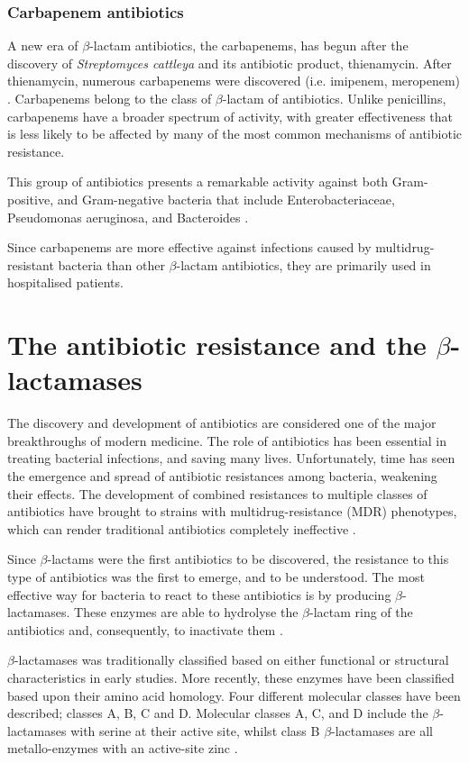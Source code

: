 \documentclass[11pt]{report}
\begin{document}
\subsection{Carbapenem antibiotics}
A new era of $\beta$-lactam antibiotics, the carbapenems, has begun after the discovery of \emph{Streptomyces cattleya} and its antibiotic product, thienamycin.
After thienamycin, numerous carbapenems were discovered (i.e. imipenem, meropenem) \cite{Birnbaum1985}.
Carbapenems belong to the class of $\beta$-lactam of antibiotics. 
Unlike penicillins, carbapenems have a broader spectrum of activity, with greater effectiveness that is less likely to be affected by many of the most common mechanisms of antibiotic resistance.

This group of antibiotics presents a remarkable activity against both Gram-positive, and Gram-negative bacteria that include Enterobacteriaceae, Pseudomonas aeruginosa, and Bacteroides \cite{Neu1985}.

Since carbapenems are more effective against infections caused by multidrug-resistant bacteria than other $\beta$-lactam antibiotics, they are primarily used in hospitalised patients.

\chapter{The antibiotic resistance and the $\beta$-lactamases}

The discovery and development of antibiotics are considered one of the major breakthroughs of modern medicine.
The role of antibiotics has been essential in treating bacterial infections, and saving many lives.
Unfortunately, time has seen the emergence and spread of antibiotic resistances among bacteria, weakening their effects.
The development of combined resistances to multiple classes of antibiotics have brought to strains with multidrug-resistance (MDR) phenotypes, which can render traditional antibiotics completely ineffective \cite{Rossolini2014}.

Since $\beta$-lactams were the first antibiotics to be discovered, the resistance to this type of antibiotics was the first to emerge, and to be understood.
The most effective way for bacteria to react to these antibiotics is by producing $\beta$-lactamases.
These enzymes are able to hydrolyse the $\beta$-lactam ring of the antibiotics and, consequently, to inactivate them \cite{kong2010beta}.

$\beta$-lactamases was traditionally classified based on either functional or structural characteristics in early studies.
More recently, these enzymes have been classified based upon their amino acid homology. Four different molecular classes have been described; classes A, B, C and D. Molecular classes A, C, and D include the $\beta$-lactamases with serine at their active site, whilst class B $\beta$-lactamases are all metallo-enzymes with an active-site zinc \cite{Queenan2007}.
\end{document}
